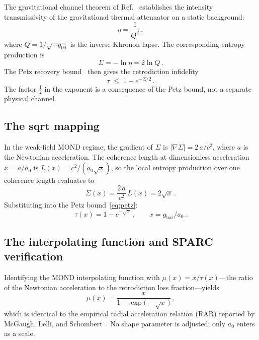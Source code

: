 \documentclass[prl,twocolumn,superscriptaddress,longbibliography]{revtex4-2}
\newcommand{\azero}{a_0}
\begin{document}
The gravitational channel theorem of Ref.~\cite{PaperII}
establishes the intensity transmissivity of the
gravitational thermal attenuator on a static background:
\begin{equation}\label{eq:eta_temporal}
  \eta = \frac{1}{Q^2} \,,
\end{equation}
where $Q = 1/\sqrt{-g_{00}}$ is the inverse Khronon lapse.
The corresponding entropy production is
\begin{equation}
  \Sigma = -\ln\eta = 2\ln Q \,.
\end{equation}
The Petz recovery bound~\cite{PaperI} then gives
the retrodiction infidelity
\begin{equation}\label{eq:petz}
  \tau \;\leq\; 1 - e^{-\Sigma/2} \,.
\end{equation}
The factor $\tfrac{1}{2}$ in the exponent is a
consequence of the Petz bound, not a separate
physical channel.

\subsection{The sqrt mapping}

In the weak-field MOND regime, the gradient of
$\Sigma$ is $|\nabla\Sigma| = 2\,a/c^2$,
where $a$ is the Newtonian acceleration.
The coherence length at dimensionless acceleration
$x = a/\azero$ is $L(x) = c^2/(\azero\sqrt{x})$,
so the local entropy production over one
coherence length evaluates to
\begin{equation}\label{eq:sigma_local}
  \Sigma(x) = \frac{2\,a}{c^2}\,L(x) = 2\sqrt{x} \,.
\end{equation}
Substituting into the Petz bound~\eqref{eq:petz}:
\begin{equation}\label{eq:tau_mond}
  \boxed{\tau(x) = 1 - e^{-\sqrt{x}}
  \,,\qquad x = g_{\mathrm{bar}}/\azero} \,.
\end{equation}

\subsection{The interpolating function and SPARC verification}

Identifying the MOND interpolating function with
$\mu(x) = x/\tau(x)$---the ratio of the
Newtonian acceleration to the retrodiction
loss fraction---yields
\begin{equation}\label{eq:mu_crooks}
  \boxed{\mu(x) = \frac{x}{1 - \exp\!\bigl(-\sqrt{x}\,\bigr)}} \,,
\end{equation}
which is identical to the empirical radial acceleration relation
(RAR) reported by McGaugh, Lelli, and
Schombert~\cite{McGaugh2016}.
No shape parameter is adjusted;
only $\azero$ enters as a scale.
\end{document}
